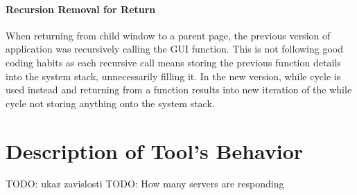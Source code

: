 \paragraph{Recursion Removal for Return}
When returning from child window to a parent page, the previous version of application was recursively calling the GUI function. This is not following good coding habits as each recursive call means storing the previous function details into the system stack, unnecessarily filling it. In the new version, while cycle is used instead and returning from a function results into new iteration of the while cycle not storing anything onto the system stack. 
\section{Description of Tool's Behavior}
\label{section:implementapproach}
TODO: ukaz zavislosti
TODO: How many servers are responding